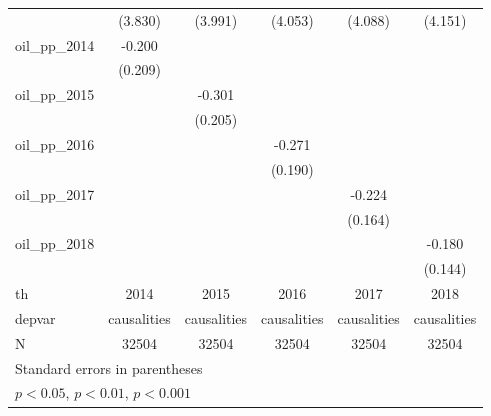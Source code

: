 {\begin{tabular}{l*{5}{c}}
            &     (3.830)         &     (3.991)         &     (4.053)         &     (4.088)         &     (4.151)         \\
[1em]
oil\_pp\_2014 &      -0.200         &                     &                     &                     &                     \\
            &     (0.209)         &                     &                     &                     &                     \\
[1em]
oil\_pp\_2015 &                     &      -0.301         &                     &                     &                     \\
            &                     &     (0.205)         &                     &                     &                     \\
[1em]
oil\_pp\_2016 &                     &                     &      -0.271         &                     &                     \\
            &                     &                     &     (0.190)         &                     &                     \\
[1em]
oil\_pp\_2017 &                     &                     &                     &      -0.224         &                     \\
            &                     &                     &                     &     (0.164)         &                     \\
[1em]
oil\_pp\_2018 &                     &                     &                     &                     &      -0.180         \\
            &                     &                     &                     &                     &     (0.144)         \\
\hline
th          &        2014         &        2015         &        2016         &        2017         &        2018         \\
depvar      & causalities         & causalities         & causalities         & causalities         & causalities         \\
N           &       32504         &       32504         &       32504         &       32504         &       32504         \\
\hline\hline
\multicolumn{6}{l}{\footnotesize Standard errors in parentheses}\\
\multicolumn{6}{l}{\footnotesize \sym{*} \(p<0.05\), \sym{**} \(p<0.01\), \sym{***} \(p<0.001\)}\\
\end{tabular}
}
